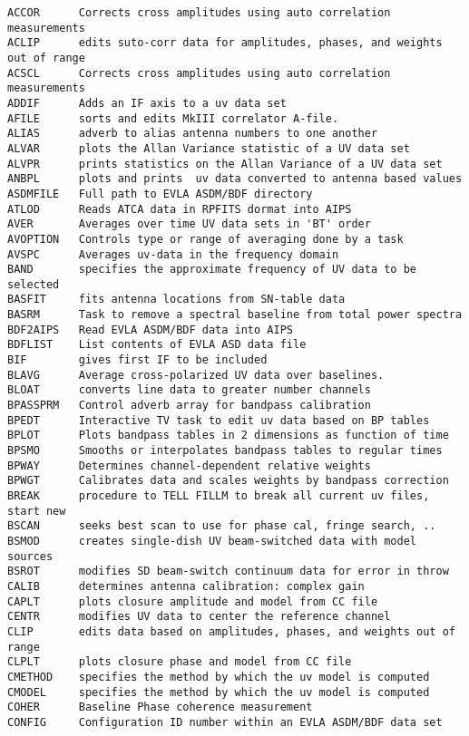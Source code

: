 \vskip 0.5pt
\bbve\begin{verbatim}
ACCOR      Corrects cross amplitudes using auto correlation measurements
ACLIP      edits suto-corr data for amplitudes, phases, and weights out of range
ACSCL      Corrects cross amplitudes using auto correlation measurements
ADDIF      Adds an IF axis to a uv data set
AFILE      sorts and edits MkIII correlator A-file.
ALIAS      adverb to alias antenna numbers to one another
ALVAR      plots the Allan Variance statistic of a UV data set
ALVPR      prints statistics on the Allan Variance of a UV data set
ANBPL      plots and prints  uv data converted to antenna based values
ASDMFILE   Full path to EVLA ASDM/BDF directory
ATLOD      Reads ATCA data in RPFITS dormat into AIPS
AVER       Averages over time UV data sets in 'BT' order
AVOPTION   Controls type or range of averaging done by a task
AVSPC      Averages uv-data in the frequency domain
BAND       specifies the approximate frequency of UV data to be selected
BASFIT     fits antenna locations from SN-table data
BASRM      Task to remove a spectral baseline from total power spectra
BDF2AIPS   Read EVLA ASDM/BDF data into AIPS
BDFLIST    List contents of EVLA ASD data file
BIF        gives first IF to be included
BLAVG      Average cross-polarized UV data over baselines.
BLOAT      converts line data to greater number channels
BPASSPRM   Control adverb array for bandpass calibration
BPEDT      Interactive TV task to edit uv data based on BP tables
BPLOT      Plots bandpass tables in 2 dimensions as function of time
BPSMO      Smooths or interpolates bandpass tables to regular times
BPWAY      Determines channel-dependent relative weights
BPWGT      Calibrates data and scales weights by bandpass correction
BREAK      procedure to TELL FILLM to break all current uv files, start new
BSCAN      seeks best scan to use for phase cal, fringe search, ..
BSMOD      creates single-dish UV beam-switched data with model sources
BSROT      modifies SD beam-switch continuum data for error in throw
CALIB      determines antenna calibration: complex gain
CAPLT      plots closure amplitude and model from CC file
CENTR      modifies UV data to center the reference channel
CLIP       edits data based on amplitudes, phases, and weights out of range
CLPLT      plots closure phase and model from CC file
CMETHOD    specifies the method by which the uv model is computed
CMODEL     specifies the method by which the uv model is computed
COHER      Baseline Phase coherence measurement
CONFIG     Configuration ID number within an EVLA ASDM/BDF data set

\end{verbatim}
